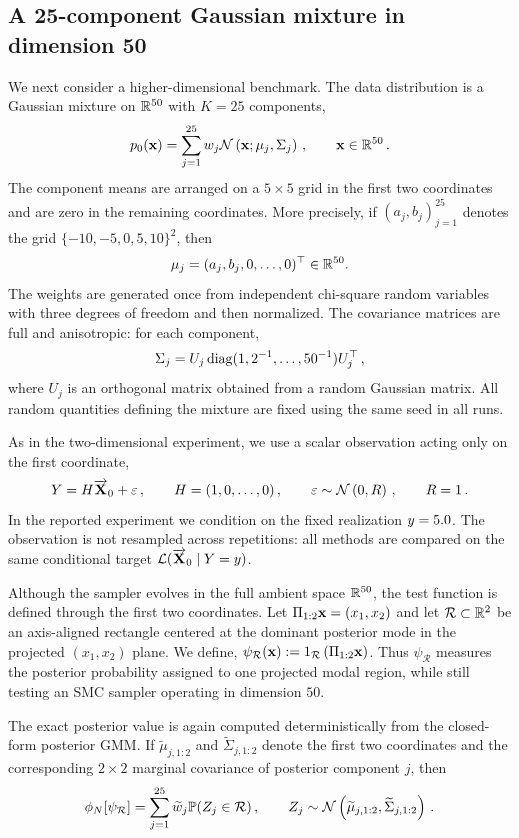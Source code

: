 \documentclass[11pt]{article}
\theoremstyle{plain}
\theoremstyle{definition}
\theoremstyle{remark}
\begin{document}
\subsection{A 25-component Gaussian mixture in dimension 50}
\label{sec:num_50d_gmm_experiment}

We next consider a higher-dimensional benchmark.  The data distribution is a Gaussian mixture on $\mathbb{R}^{50}$ with $K=25$ components,
$$
p_0 (\x) = \sum_{j=1}^{25} w_j \gaussiand{\mu_j}{\Sigma_j}[\x] \eqsp, \qquad \x\in\rset^{50} \eqsp.
$$
The component means are arranged on a $5\times5$ grid in the first two coordinates and are zero in the remaining coordinates.  More precisely, if $(a_j,b_j)_{j=1}^{25}$ denotes the grid $\{-10,-5,0,5,10\}^2$, then
$$
\mu_j = (a_j,b_j,0,\ldots,0)^\top \in \mathbb{R}^{50}.
$$
The weights are generated once from independent chi-square random variables with three degrees of freedom and then normalized. The covariance matrices are full and anisotropic: for each component,
$$
\Sigma_j = U_j \operatorname{diag}(1,2^{-1},\ldots,50^{-1}) U_j^\top \,,
$$
where $U_j$ is an orthogonal matrix obtained from a random Gaussian matrix. All random quantities defining the mixture are fixed using the same seed in all runs. 

As in the two-dimensional experiment, we use a scalar observation acting only on the first coordinate,
$$
\Xobs = H\Xora_0+\varepsilon \eqsp, \qquad H=(1,0,\ldots,0) \eqsp,
\qquad \varepsilon\sim\gaussiand{0}{R} \eqsp,
\qquad R=1 \eqsp.
$$
In the reported experiment we condition on the fixed realization $y=5.0$.  The observation is not resampled across repetitions: all methods are compared on the same conditional target $\mathcal L(\overrightarrow{\mathbf{X}}_0\mid Y=y)$.

Although the sampler evolves in the full ambient space $\mathbb{R}^{50}$, the test function is defined through the first two coordinates.  Let $\Pi_{1:2}\mathbf{x}=(x_1,x_2)$ and let $\mathcal R\subset\mathbb{R}^2$ be an axis-aligned rectangle centered at the dominant posterior mode in the projected $(x_1,x_2)$ plane. We define, $\psi_{\mathcal R}(\x) \eqdef \indi{\mathcal R}[\Pi_{1:2}\x]$. Thus $\psi_{\mathcal R}$ measures the posterior probability assigned to one projected modal region, while still testing an SMC sampler operating in dimension $50$.

The exact posterior value is again computed deterministically from the closed-form posterior GMM.  If $\widetilde\mu_{j,1:2}$ and $\widetilde\Sigma_{j,1:2}$ denote the first two coordinates and the corresponding $2\times2$ marginal covariance of posterior component $j$, then
$$
\filter{N}[\psi_{\mathcal R}] = \sum_{j=1}^{25} \widetilde w_j \mathbb P(Z_j\in\mathcal R) \eqsp, \qquad Z_j\sim \gaussiand{\widetilde\mu_{j,1:2}}{\widetilde\Sigma_{j,1:2}} \eqsp.
$$
\end{document}
